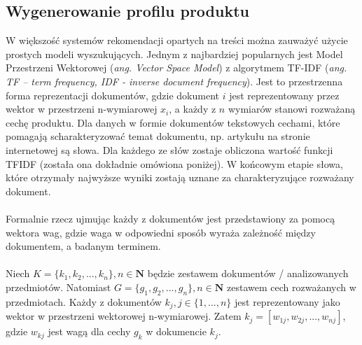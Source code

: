 \documentclass[12pt,a4paper]{report}
\begin{document}
\subsection{Wygenerowanie profilu produktu}
W większość systemów rekomendacji opartych na treści można zauważyć użycie prostych modeli wyszukujących. Jednym z najbardziej popularnych jest Model Przestrzeni Wektorowej (\textit{ang. Vector Space Model}) z algorytmem TF-IDF (\textit{ang. TF – term frequency, IDF - inverse document frequency}). Jest to przestrzenna forma reprezentacji dokumentów, gdzie dokument $i$ jest reprezentowany przez wektor w przestrzeni n-wymiarowej $x_{i}$, a każdy z $n$ wymiarów stanowi rozważaną cechę produktu. Dla danych w formie dokumentów tekstowych cechami, które pomagają scharakteryzować temat dokumentu, np. artykułu na stronie internetowej są słowa. Dla każdego ze słów zostaje obliczona wartość funkcji TFIDF (została ona dokładnie omówiona poniżej). W końcowym etapie słowa, które otrzymały najwyższe wyniki zostają uznane za charakteryzujące rozważany dokument.
\\
\\Formalnie rzecz ujmując każdy z dokumentów jest przedstawiony za pomocą wektora wag, gdzie waga w odpowiedni sposób wyraża zależność między dokumentem, a badanym terminem.
\\
\\Niech \begin{math} K = \{k_1, k_2,...,k_n\}, n\in{\mathbf{N}} \end{math} będzie zestawem dokumentów / analizowanych przedmiotów. Natomiast \begin{math}G = \{g_1, g_2,...,g_n\}, n\in{\mathbf{N}} \end{math} zestawem cech rozważanych w przedmiotach. Każdy z dokumentów \begin{math} k_j, j\in{\{1,...,n\}} \end{math} jest reprezentowany jako wektor w przestrzeni wektorowej n-wymiarowej. Zatem \begin{math} k_j = [w_{1j}, w_{2j},...,w_{nj}] \end{math}, gdzie \begin{math} w_{kj} \end{math}  jest wagą dla cechy \begin{math} g_k \end{math} w dokumencie  \begin{math} k_j \end{math}.
\\
\\
\end{document}
